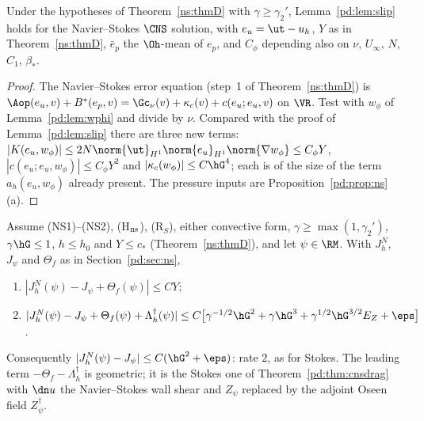 \begin{lemma}\label{n2:slip}
Under the hypotheses of Theorem~\ref{ns:thmD} with $\gamma\ge\gamma_2'$, Lemma~\ref{pd:lem:slip} holds for the Navier--Stokes $\CNS$ solution,
with $e_u=\ut-u_h$, $Y$ as in Theorem~\ref{ns:thmD}, $\bar e_p$ the $\Oh$-mean of $e_p$, and $C_\phi$ depending also on $\nu$, $U_\infty$, $N$, $C_1$, $\beta_\ast$.
\end{lemma}

\begin{proof}
The Navier--Stokes error equation (step~1 of Theorem~\ref{ns:thmD}) is $\Aop(e_u,v)+B^\ast(e_p,v)=\Gc_\nu(v)+\kappa_c(v)+c(e_u;e_u,v)$ on $\VR$.
Test with $w_\phi$ of Lemma~\ref{pd:lem:wphi} and divide by $\nu$. Compared with the proof of Lemma~\ref{pd:lem:slip} there are three new terms:
$|K(e_u,w_\phi)|\le2N\norm{\ut}_{H^1}\norm{e_u}_{H^1}\norm{\nabla w_\phi}\le C_\phi Y$, $|c(e_u;e_u,w_\phi)|\le C_\phi Y^2$ and $|\kappa_c(w_\phi)|\le C\hG^4$;
each is of the size of the term $a_h(e_u,w_\phi)$ already present. The pressure inputs are Proposition~\ref{pd:prop:ns}(a).
\end{proof}

\begin{theorem}\label{n2:cnsdrag}
Assume (NS1)--(NS2), (H$_{\rm ns}$), (R$_S$), either convective form, $\gamma\ge\max(1,\gamma_2')$, $\gamma\hG\le1$, $h\le h_0$ and $Y\le c_\ast$
(Theorem~\ref{ns:thmD}), and let $\psi\in\RM$. With $J^N_h$, $J_\psi$ and $\Theta_f$ as in Section~\ref{pd:sec:ns},
\begin{enumerate}[label=(\alph*)]
\item $|J^N_h(\psi)-J_\psi+\Theta_f(\psi)|\le CY$;
\item $|J^N_h(\psi)-J_\psi+\Theta_f(\psi)+\Lambda^\dagger_h(\psi)|\le C\bigl[\gamma^{-1/2}\hG^2+\gamma\hG^3+\gamma^{1/2}\hG^{3/2}E_Z+\eps\bigr]$.
\end{enumerate}
Consequently $|J^N_h(\psi)-J_\psi|\le C(\hG^2+\eps)$: rate $2$, as for Stokes. The leading term $-\Theta_f-\Lambda^\dagger_h$ is geometric; it is
the Stokes one of Theorem~\ref{pd:thm:cnsdrag} with $\dn u$ the Navier--Stokes wall shear and $Z_\psi$ replaced by the adjoint Oseen field
$Z^\dagger_\psi$.
\end{theorem}

